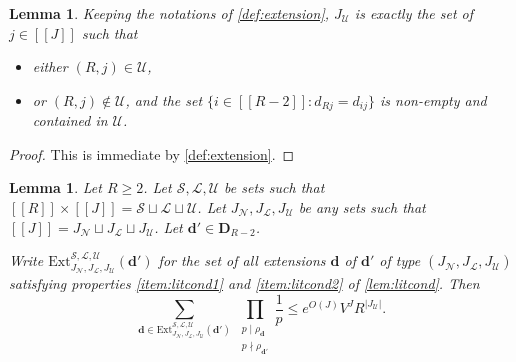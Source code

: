 \documentclass[11pt]{amsart}
\newtheorem{lemma}[theorem]{Lemma}
\theoremstyle{definition}
\renewcommand{\leq}{\leqslant}
\renewcommand{\geq}{\geqslant}
\newcommand{\sinterval}[1]{[\![#1]\!] }
\newcommand{\abs}[1]{\left|#1\right|}
\renewcommand{\d}{\boldsymbol{d}}
\newcommand{\pcomp}[2]{d_{#1#2}}
\newcommand{\curlyL}{V}
\newcommand{\fprod}[1]{\rho_{#1}}
\newcommand{\pall}{\fprod{\d}}
\newcommand{\pallprime}{\fprod{\d'}}
\newcommand{\ext}{\mathrm{Ext}}
\newcommand{\lit}{\mathcal{L}}
\newcommand{\unlit}{\mathcal{U}}
\newcommand{\s}{\mathcal{S}}
\newcommand{\new}{\mathcal{N}}
\newcommand{\fancyD}{\mathbf{D}}
\newcommand{\Dsfmix}[1]{\fancyD_{\!#1}}
\newcommand{\repR}{J}
\newcommand{\newR}{\sinterval{J}}
\newcommand{\tupsize}{R}
\begin{document}
\begin{lemma}
\label{lem:Junlitanalysis}
Keeping the notations of \cref{def:extension}, $J_{\unlit}$ is exactly the set of $j\in \newR$ such that
\begin{itemize}
	\item either $(\tupsize,j)\in \unlit$,
	\item or $(\tupsize,j)\not\in \unlit$, and the set $\{i\in \sinterval{\tupsize-2}: \pcomp{\tupsize}{j} = \pcomp{i}{j}\}$ is non-empty and contained in $\unlit$.
\end{itemize}
\end{lemma}
\begin{proof}
This is immediate by \cref{def:extension}.
\end{proof}

\begin{lemma}
\label{lem:onepairbacktracking}
Let $\tupsize \geq 2$. Let $\s,\lit,\unlit$ be sets such that $\sinterval{\tupsize}\times \newR = \s\sqcup \lit\sqcup \unlit$. Let $J_{\new}, J_{\lit}, J_{\unlit}$ be any sets such that $\newR = J_{\new} \sqcup J_{\lit}\sqcup J_{\unlit}$. Let $\d'\in \Dsfmix{\tupsize-2}$. 

Write $\ext_{J_{\new}, J_{\lit}, J_{\unlit}}^{\s,\lit,\unlit}(\d')$ for the set of all extensions $\d$ of $\d'$ of type $(J_{\new}, J_{\lit}, J_{\unlit})$ satisfying properties \cref{item:litcond1} and \cref{item:litcond2} of \cref{lem:litcond}. Then
\begin{equation*}
	\sum_{\d \in \ext_{J_{\new}, J_{\lit}, J_{\unlit}}^{\s,\lit,\unlit}(\d')}  \, \prod_{\substack{p\mid \pall\\ p\nmid \pallprime}} \frac{1}{p} \leq e^{O(\repR)} \curlyL^{\repR} \tupsize^{\abs{J_{\unlit}}}.
\end{equation*}
\end{lemma}
\end{document}
